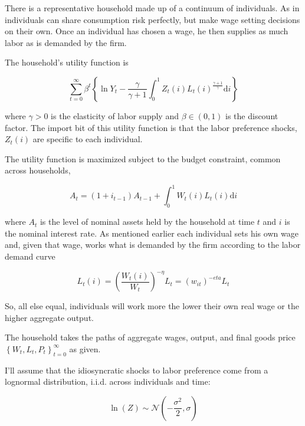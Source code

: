 \documentclass[12pt,a4paper]{scrartcl}            %
\begin{document}
There is a representative household made up of a continuum of individuals.
As in \cite{erceg_henderson_levin_1999} individuals can share consumption risk perfectly, but make wage setting decisions on their own.
Once an individual has chosen a wage, he then supplies as much labor as is demanded by the firm.

The household's utility function is

\begin{equation} \label{eq:utility}
    \sum_{t=0}^{\infty} \beta^t \left\{\ln Y_t - \frac{\gamma}{\gamma + 1} \int_{0}^{1} Z_t(i)L_t(i)^{\frac{\gamma + 1}{\gamma}}\mathrm{d}i\right\}
\end{equation}

where $\gamma > 0$ is the elasticity of labor supply and $\beta \in (0, 1)$ is the discount factor.
The import bit of this utility function is that the labor preference shocks, $Z_t(i)$ are specific to each individual.

The utility function is maximized subject to the budget constraint, common across households,

\begin{equation}
    \label{eq:budget}
    A_t = \left(1 + i_{t-1}\right)A_{t-1} + \int_{0}^{1} W_t(i)L_t(i)\mathrm{d}i
\end{equation}

where $A_t$ is the level of nominal assets held by the household at time $t$ and $i$ is the nominal interest rate.
As mentioned earlier each individual sets his own wage and, given that wage, works what is demanded by the firm according to the labor demand curve

\begin{equation}
    \label{eq:labor_demand}
    L_t(i) = \left( \frac{W_t(i)}{W_t} \right)^{-\eta}L_t = (w_{it})^{-eta}L_t
\end{equation}

So, all else equal, individuals will work more the lower their own real wage or the higher aggregate output.

The household takes the paths of aggregate wages, output, and final goods price $\left\{W_t, L_t, P_t \right\}_{t=0}^{\infty}$ as given.

I'll assume that the idiosyncratic shocks to labor preference come from a lognormal distribution, i.i.d. across individuals and time:

\begin{equation}
    \label{eq:shock_dist}
    \ln(Z) \sim \mathcal{N}\left(-\frac{\sigma^2}{2}, \sigma\right)
\end{equation}
\end{document}

